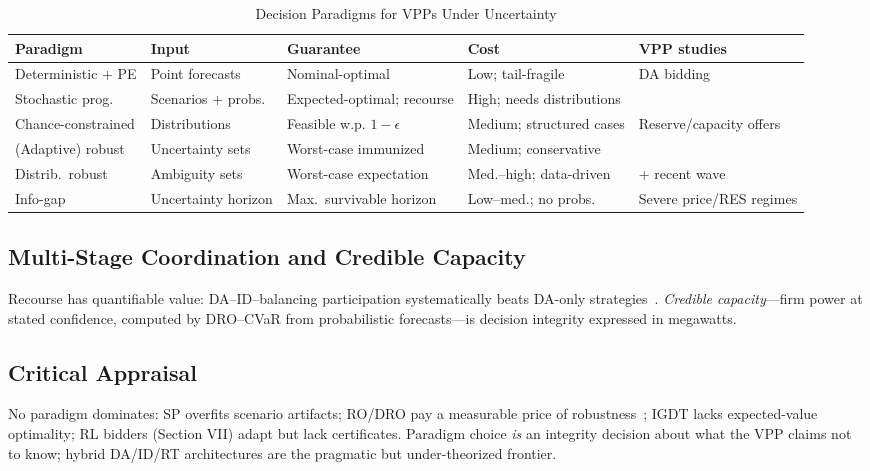 \documentclass[journal]{IEEEtran}
\begin{document}
\begin{table}[htbp]
\caption{Decision Paradigms for VPPs Under Uncertainty}
\label{tab:paradigms}
\centering
\begin{tabular}{p{2.4cm}p{2.6cm}p{3.4cm}p{2.6cm}p{3.6cm}}
\toprule
\textbf{Paradigm} & \textbf{Input} & \textbf{Guarantee} & \textbf{Cost} & \textbf{VPP studies} \\
\midrule
Deterministic + PE & Point forecasts & Nominal-optimal & Low; tail-fragile & DA bidding~\cite{peikherfeh2013} \\
Stochastic prog. & Scenarios + probs. & Expected-optimal; recourse & High; needs distributions & \cite{kardakos2016,pandzic2013a,pandzic2013b,wozabal2020,silva2022} \\
Chance-constrained & Distributions & Feasible w.p. $1-\epsilon$ & Medium; structured cases & Reserve/capacity offers \\
(Adaptive) robust & Uncertainty sets & Worst-case immunized & Medium; conservative & \cite{rahimiyan2016,baringo2017} \\
Distrib.\ robust & Ambiguity sets & Worst-case expectation & Med.--high; data-driven & \cite{liudro2022} + recent wave \\
Info-gap & Uncertainty horizon & Max.\ survivable horizon & Low--med.; no probs.\ & Severe price/RES regimes \\
\bottomrule
\end{tabular}
\end{table}

\subsection{Multi-Stage Coordination and Credible Capacity}
Recourse has quantifiable value: DA--ID--balancing participation systematically beats DA-only strategies~\cite{pandzic2013b,wozabal2020,silva2022}. \textit{Credible capacity}---firm power at stated confidence, computed by DRO--CVaR from probabilistic forecasts---is decision integrity expressed in megawatts.

\subsection{Critical Appraisal}
No paradigm dominates: SP overfits scenario artifacts; RO/DRO pay a measurable price of robustness~\cite{bertsimas2004}; IGDT lacks expected-value optimality; RL bidders (Section VII) adapt but lack certificates. Paradigm choice \textit{is} an integrity decision about what the VPP claims not to know; hybrid DA/ID/RT architectures are the pragmatic but under-theorized frontier.
\end{document}
